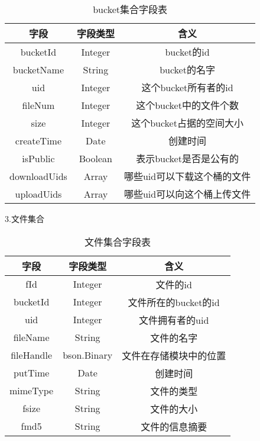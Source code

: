 \begin{table}[h]
    \centering
    \caption{bucket集合字段表}
    \begin{tabular}{ccc}
      \toprule
      字段   & 字段类型   & 含义                          \\
      \midrule
      bucketId      & Integer  & bucket的id                 \\
      bucketName    & String   & bucket的名字                \\
      uid           & Integer  & 这个bucket所有者的id         \\
      fileNum       & Integer  & 这个bucket中的文件个数         \\
      size          & Integer  & 这个bucket占据的空间大小         \\
      createTime    & Date     & 创建时间                     \\
      isPublic      & Boolean  & 表示bucket是否是公有的        \\
      downloadUids  & Array    & 哪些uid可以下载这个桶的文件  \\
      uploadUids    & Array    & 哪些uid可以向这个桶上传文件  \\
      \bottomrule
    \end{tabular}
\end{table}

3.文件集合

\begin{table}[h]
  \centering
  \caption{文件集合字段表}
  \begin{tabular}{ccc}
    \toprule
    字段   & 字段类型   & 含义                          \\
    \midrule
    fId        & Integer     & 文件的id                 \\
    bucketId   & Integer     & 文件所在的bucket的id                 \\
    uid        & Integer     & 文件拥有者的uid                 \\
    fileName   & String      & 文件的名字                \\
    fileHandle & bson.Binary & 文件在存储模块中的位置         \\
    putTime    & Date        & 创建时间                     \\
    mimeType   & String      & 文件的类型        \\
    fsize      & String      & 文件的大小  \\
    fmd5       & String      & 文件的信息摘要  \\
    \bottomrule
  \end{tabular}
\end{table}


